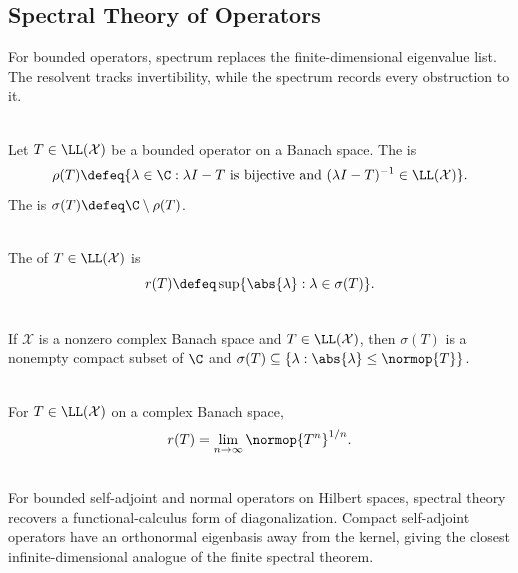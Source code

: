 \subsection{Spectral Theory of Operators}

%

For bounded operators, spectrum replaces the finite-dimensional eigenvalue list. The resolvent tracks invertibility, while the spectrum records every obstruction to it.

\begin{definition} \label{def:bounded-operator-spectrum-resolvent} \\
Let $T\in\LL(\mathcal{X})$ be a bounded operator on a Banach space. The  is
\[
\rho(T)\defeq\{\lambda\in\C:\lambda I-T\text{ is bijective and }(\lambda I-T)^{-1}\in\LL(\mathcal{X})\}.
\]
The  is $\sigma(T)\defeq\C\setminus\rho(T)$.
\end{definition}

\begin{definition} \label{def:spectral-radius-bounded-operator} \\
The  of $T\in\LL(\mathcal{X})$ is
\[
r(T)\defeq\sup\{\abs{\lambda}:\lambda\in\sigma(T)\}.
\]
\end{definition}

\begin{theorem} \label{thm:spectrum-nonempty-compact-bounded-operator} \\
If $\mathcal{X}$ is a nonzero complex Banach space and $T\in\LL(\mathcal{X})$, then $\sigma(T)$ is a nonempty compact subset of $\C$ and $\sigma(T)\subseteq\{\lambda:\abs{\lambda}\leq\normop{T}\}$.
\end{theorem}

\begin{theorem} \label{thm:spectral-radius-formula} \\
For $T\in\LL(\mathcal{X})$ on a complex Banach space,
\[
r(T)=\lim_{n\to\infty}\normop{T^n}^{1/n}.
\]
\end{theorem}

\begin{perspective} \label{per:hilbert-operator-spectral-theory} \\
For bounded self-adjoint and normal operators on Hilbert spaces, spectral theory recovers a functional-calculus form of diagonalization. Compact self-adjoint operators have an orthonormal eigenbasis away from the kernel, giving the closest infinite-dimensional analogue of the finite spectral theorem.
\end{perspective}
